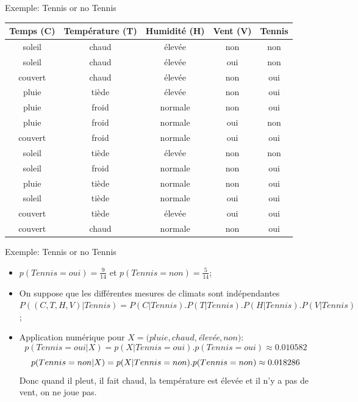 \documentclass[8pt]{beamer}
\begin{document}
			\begin{frame}{Exemple: Tennis or no Tennis}
				\begin{table}[H]
					\begin{center}
						\begin{tabular}{c c c c c}
							\toprule
							Temps (C) & Température (T) & Humidité (H) & Vent (V) & Tennis\\
							\midrule
							soleil & chaud & élevée & non & non\\
							soleil & chaud & élevée & oui & non\\
							couvert & chaud & élevée & non & oui\\
							pluie & tiède & élevée & non & oui\\
							pluie & froid & normale & non & oui\\
							pluie & froid & normale & oui & non\\
							couvert & froid & normale & oui & oui\\
							soleil & tiède & élevée & non & non\\
							soleil & froid & normale & non & oui\\
							pluie & tiède & normale & non & oui\\
							soleil & tiède & normale & oui & oui\\
							couvert & tiède & élevée & oui & oui\\
							couvert & chaud & normale & non & oui\\
							\bottomrule
						\end{tabular}
					\end{center}
				\end{table}
			\end{frame}
			\begin{frame}{Exemple: Tennis or no Tennis}
				\begin{itemize}
					\item \(p(Tennis = oui) = \frac{9}{14}\) et \(p(Tennis = non) = \frac{5}{14}\);
					\item On suppose que les différentes mesures de climats sont indépendantes \(P((C, T, H, V) \vert Tennis) = P(C\vert Tennis).P(T\vert Tennis).P(H\vert Tennis).P(V\vert Tennis)\);
					\item Application numérique pour \(X=(pluie, chaud,\)\textit{élevée}\(, non)\): 
						\[p(Tennis = oui \vert X) = p(X\vert Tennis = oui) . p(Tennis = oui) \approx 0.010582\]
						\[p(Tennis = non \vert X) = p(X\vert Tennis = non) . p(Tennis = non) \approx \boldmath 0.018286\]
						Donc quand il pleut, il fait chaud, la température est élevée et il n'y a pas de vent, on ne joue pas.
				\end{itemize}
			\end{frame}
\end{document}
